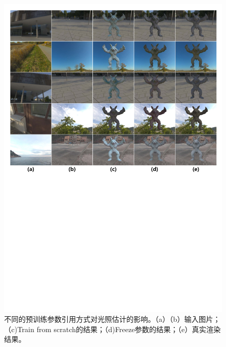 \begin{figure}
  \includegraphics[width=1.0\columnwidth]{Img/fig-fixornot.pdf}
  \caption[不同的预训练参数引用方式对光照估计的影响]{
  \label{fig:fix-backbone}
  不同的预训练参数引用方式对光照估计的影响。（a）（b）输入图片；（c)Train from scratch的结果；（d)Freeze参数的结果；（e）真实渲染结果。
  }
\end{figure}